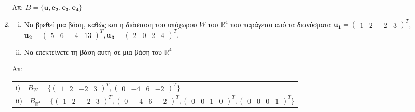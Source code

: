 \begin{enumerate}
            \hfill Απ: $ B = 
            \{ 
                \mathbf{u}, \mathbf{e_{2}}, \mathbf{e_{3}}, 
                \mathbf{e_{4}} 
            \} $  

        \item 
            \begin{enumerate}[i)]
                \item Να βρεθεί μια βάση, καθώς και η διάσταση του υπόχωρου $W$ του 
                    $ \mathbb{R}^{4} $ που παράγεται από τα διανύσματα 
                    $ \mathbf{u_{1}} = \begin{pmatrix}1 & 2 & -2 & 3\end{pmatrix}^{T} $,
                    $ \mathbf{u_{2}} = \begin{pmatrix}5 & 6 & -4 & 13\end{pmatrix}^{T}, 
                    \mathbf{u_{3}} = \begin{pmatrix}2 & 0 & 2 & 4\end{pmatrix}^{T} $.
                \item Να επεκτείνετε τη βάση αυτή σε μια βάση του $\mathbb{R}^{4} $ 
            \end{enumerate}

            \hfill Απ: \begin{tabular}{l}
                $ \mathrm{i)} \quad B_{W} = 
                \{ 
                    \begin{pmatrix}1 & 2 & -2 & 3\end{pmatrix}^{T}, 
                    \begin{pmatrix}0 & -4 & 6 & -2\end{pmatrix}^{T} 
                \} $ \\
                $ \mathrm{ii)} \quad B_{\mathbb{R}^{4}} = 
                \{ 
                    \begin{pmatrix}1 & 2 & -2 & 3\end{pmatrix}^{T}, 
                    \begin{pmatrix}0 & -4 & 6 & -2 \end{pmatrix}^{T}, 
                    \begin{pmatrix}0 & 0 & 1 & 0\end{pmatrix}^{T}, 
                    \begin{pmatrix}0 & 0 & 0 & 1\end{pmatrix}^{T} 
                \} $ 
            \end{tabular}


\end{enumerate}
